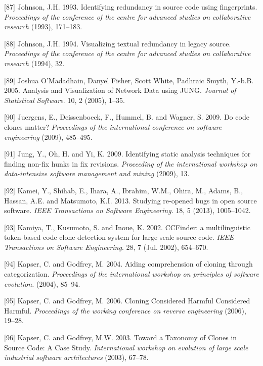 \documentclass[12pt]{report}
\begin{document}
\hypertarget{ref-Johnson1993}{}
{[}87{]} Johnson, J.H. 1993. Identifying redundancy in source code using
fingerprints. \emph{Proceedings of the conference of the centre for
advanced studies on collaborative research} (1993), 171--183.

\hypertarget{ref-Johnson1994}{}
{[}88{]} Johnson, J.H. 1994. Visualizing textual redundancy in legacy
source. \emph{Proceedings of the conference of the centre for advanced
studies on collaborative research} (1994), 32.

\hypertarget{ref-JoshuaOMadadhain}{}
{[}89{]} Joshua O'Madadhain, Danyel Fisher, Scott White, Padhraic Smyth,
Y.-b.B. 2005. Analysis and Visualization of Network Data using JUNG.
\emph{Journal of Statistical Software}. 10, 2 (2005), 1--35.

\hypertarget{ref-Juergens2009}{}
{[}90{]} Juergens, E., Deissenboeck, F., Hummel, B. and Wagner, S. 2009.
Do code clones matter? \emph{Proceedings of the international conference
on software engineering} (2009), 485--495.

\hypertarget{ref-Jung2009}{}
{[}91{]} Jung, Y., Oh, H. and Yi, K. 2009. Identifying static analysis
techniques for finding non-fix hunks in fix revisions. \emph{Proceeding
of the international workshop on data-intensive software management and
mining} (2009), 13.

\hypertarget{ref-Kamei2013}{}
{[}92{]} Kamei, Y., Shihab, E., Ihara, A., Ibrahim, W.M., Ohira, M.,
Adams, B., Hassan, A.E. and Matsumoto, K.I. 2013. Studying re-opened
bugs in open source software. \emph{IEEE Transactions on Software
Engineering}. 18, 5 (2013), 1005--1042.

\hypertarget{ref-Kamiya2002}{}
{[}93{]} Kamiya, T., Kusumoto, S. and Inoue, K. 2002. CCFinder: a
multilinguistic token-based code clone detection system for large scale
source code. \emph{IEEE Transactions on Software Engineering}. 28, 7
(Jul. 2002), 654--670.

\hypertarget{ref-Kapser}{}
{[}94{]} Kapser, C. and Godfrey, M. 2004. Aiding comprehension of
cloning through categorization. \emph{Proceedings of the international
workshop on principles of software evolution.} (2004), 85--94.

\hypertarget{ref-Kapser2006}{}
{[}95{]} Kapser, C. and Godfrey, M. 2006. Cloning Considered Harmful
Considered Harmful. \emph{Proceedings of the working conference on
reverse engineering} (2006), 19--28.

\hypertarget{ref-CoryKapser}{}
{[}96{]} Kapser, C. and Godfrey, M.W. 2003. Toward a Taxonomy of Clones
in Source Code: A Case Study. \emph{International workshop on evolution
of large scale industrial software architectures} (2003), 67--78.
\end{document}
